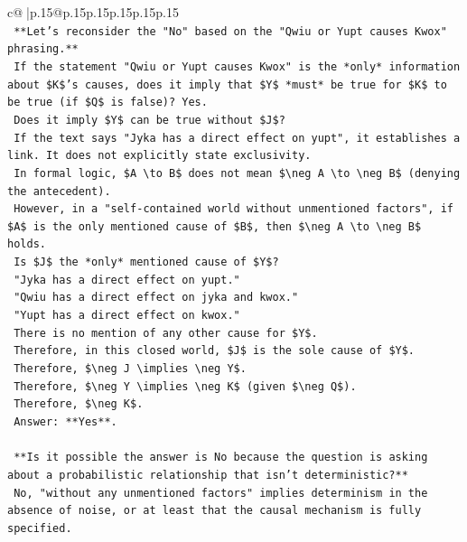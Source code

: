 \documentclass{article}
\begin{document}
{\begin{supertabular}{c@{$\;$}|p{.15\linewidth}@{}p{.15\linewidth}p{.15\linewidth}p{.15\linewidth}p{.15\linewidth}p{.15\linewidth}}
{{{\\ 
\texttt{        **Let's reconsider the "No" based on the "Qwiu or Yupt causes Kwox" phrasing.**} \\
\texttt{        If the statement "Qwiu or Yupt causes Kwox" is the *only* information about \$K\$'s causes, does it imply that \$Y\$ *must* be true for \$K\$ to be true (if \$Q\$ is false)? Yes.} \\
\texttt{        Does it imply \$Y\$ can be true without \$J\$?} \\
\texttt{        If the text says "Jyka has a direct effect on yupt", it establishes a link. It does not explicitly state exclusivity.} \\
\texttt{        In formal logic, \$A \textbackslash{}to B\$ does not mean \$\textbackslash{}neg A \textbackslash{}to \textbackslash{}neg B\$ (denying the antecedent).} \\
\texttt{        However, in a "self{-}contained world without unmentioned factors", if \$A\$ is the only mentioned cause of \$B\$, then \$\textbackslash{}neg A \textbackslash{}to \textbackslash{}neg B\$ holds.} \\
\texttt{        Is \$J\$ the *only* mentioned cause of \$Y\$?} \\
\texttt{        "Jyka has a direct effect on yupt."} \\
\texttt{        "Qwiu has a direct effect on jyka and kwox."} \\
\texttt{        "Yupt has a direct effect on kwox."} \\
\texttt{        There is no mention of any other cause for \$Y\$.} \\
\texttt{        Therefore, in this closed world, \$J\$ is the sole cause of \$Y\$.} \\
\texttt{        Therefore, \$\textbackslash{}neg J \textbackslash{}implies \textbackslash{}neg Y\$.} \\
\texttt{        Therefore, \$\textbackslash{}neg Y \textbackslash{}implies \textbackslash{}neg K\$ (given \$\textbackslash{}neg Q\$).} \\
\texttt{        Therefore, \$\textbackslash{}neg K\$.} \\
\texttt{        Answer: **Yes**.} \\
\\ 
\texttt{        **Is it possible the answer is No because the question is asking about a probabilistic relationship that isn't deterministic?**} \\
\texttt{        No, "without any unmentioned factors" implies determinism in the absence of noise, or at least that the causal mechanism is fully specified.} \\
}}}
\end{supertabular}}
\end{document}
